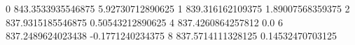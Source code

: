 0 843.3533935546875 5.92730712890625
1 839.316162109375 1.89007568359375
2 837.9315185546875 0.50543212890625
4 837.4260864257812 0.0
6 837.2489624023438 -0.1771240234375
8 837.5714111328125 0.14532470703125
